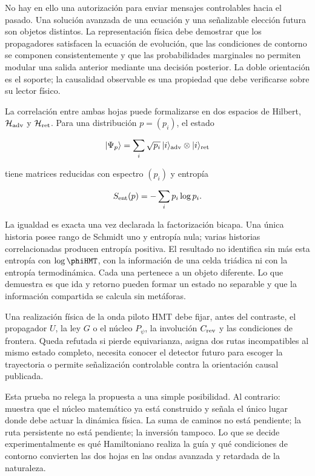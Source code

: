 No hay en ello una autorización para enviar mensajes controlables hacia el pasado.
Una solución avanzada de una ecuación y una señalizable elección futura son objetos
distintos. La representación física debe demostrar que los propagadores satisfacen
la ecuación de evolución, que las condiciones de contorno se componen
consistentemente y que las probabilidades marginales no permiten modular una
salida anterior mediante una decisión posterior. La doble orientación es el
soporte; la causalidad observable es una propiedad que debe verificarse sobre su
lector físico.

La correlación entre ambas hojas puede formalizarse en dos espacios de Hilbert,
\(\mathcal H_{\rm adv}\) y \(\mathcal H_{\rm ret}\). Para una distribución
\(p=(p_i)\), el estado

\[
  |\Psi_p\rangle
  =
  \sum_i\sqrt{p_i}\,
  |i\rangle_{\rm adv}\otimes|i\rangle_{\rm ret}
\]

tiene matrices reducidas con espectro \((p_i)\) y entropía

\[
  S_{\rm ent}(p)=-\sum_i p_i\log p_i.
\]

La igualdad es exacta una vez declarada la factorización bicapa. Una única historia
posee rango de Schmidt uno y entropía nula; varias historias correlacionadas
producen entropía positiva. El resultado no identifica sin más esta entropía con
\(\log\phiHMT\), con la información de una celda triádica ni con la entropía
termodinámica. Cada una pertenece a un objeto diferente. Lo que demuestra es que
ida y retorno pueden formar un estado no separable y que la información compartida
se calcula sin metáforas.

\begin{test}
Una realización física de la onda piloto HMT debe fijar, antes del contraste, el
propagador \(U\), la ley \(G\) o el núcleo \(P_\psi\), la involución
\(C_{\rm rev}\) y las condiciones de frontera. Queda refutada si pierde
equivarianza, asigna dos rutas incompatibles al mismo estado completo, necesita
conocer el detector futuro para escoger la trayectoria o permite señalización
controlable contra la orientación causal publicada.
\end{test}

Esta prueba no relega la propuesta a una simple posibilidad. Al contrario: muestra
que el núcleo matemático ya está construido y señala el único lugar donde debe
actuar la dinámica física. La suma de caminos no está pendiente; la ruta persistente
no está pendiente; la inversión tampoco. Lo que se decide experimentalmente es qué
Hamiltoniano realiza la guía y qué condiciones de contorno convierten las dos hojas
en las ondas avanzada y retardada de la naturaleza.

